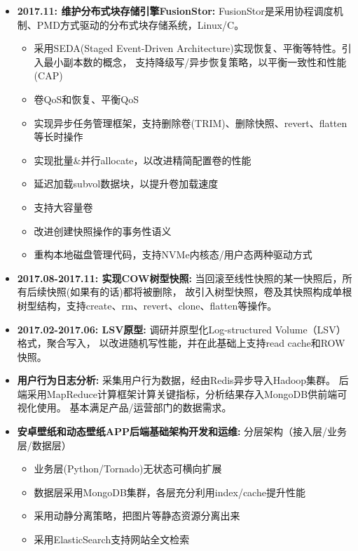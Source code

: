 
  \begin{itemize}[leftmargin=*]
      \item \textbf{2017.11: 维护分布式块存储引擎FusionStor:} FusionStor是采用协程调度机制、PMD方式驱动的分布式块存储系统，Linux/C。
          {\small
          \begin{itemize}
              \item 采用SEDA(Staged Event-Driven Architecture)实现恢复、平衡等特性。引入最小副本数的概念，
                  支持降级写/异步恢复策略，以平衡一致性和性能(CAP)
              \item 卷QoS和恢复、平衡QoS
              \item 实现异步任务管理框架，支持删除卷(TRIM)、删除快照、revert、flatten等长时操作
              \item 实现批量\&并行allocate，以改进精简配置卷的性能
              \item 延迟加载subvol数据块，以提升卷加载速度
              \item 支持大容量卷
              \item 改进创建快照操作的事务性语义
              \item 重构本地磁盘管理代码，支持NVMe内核态/用户态两种驱动方式
          \end{itemize}
          }

      \item \textbf{2017.08-2017.11: 实现COW树型快照:} 当回滚至线性快照的某一快照后，所有后续快照(如果有的话)都将被删除，
          故引入树型快照，卷及其快照构成单根树型结构，支持create、rm、revert、clone、flatten等操作。

      \item \textbf{2017.02-2017.06: LSV原型:} 调研并原型化Log-structured Volume（LSV）格式，聚合写入，
          以改进随机写性能，并在此基础上支持read cache和ROW快照。

      \item \textbf{用户行为日志分析:} 采集用户行为数据，经由Redis异步导入Hadoop集群。
          后端采用MapReduce计算框架计算关键指标，分析结果存入MongoDB供前端可视化使用。
          基本满足产品/运营部门的数据需求。

      \item \textbf{安卓壁纸和动态壁纸APP后端基础架构开发和运维:} 分层架构（接入层/业务层/数据层）
          {\small
          \begin{itemize}
              \item 业务层(Python/Tornado)无状态可横向扩展
              \item 数据层采用MongoDB集群，各层充分利用index/cache提升性能
              \item 采用动静分离策略，把图片等静态资源分离出来
              \item 采用ElasticSearch支持网站全文检索
          \end{itemize}
          }


\end{itemize}

